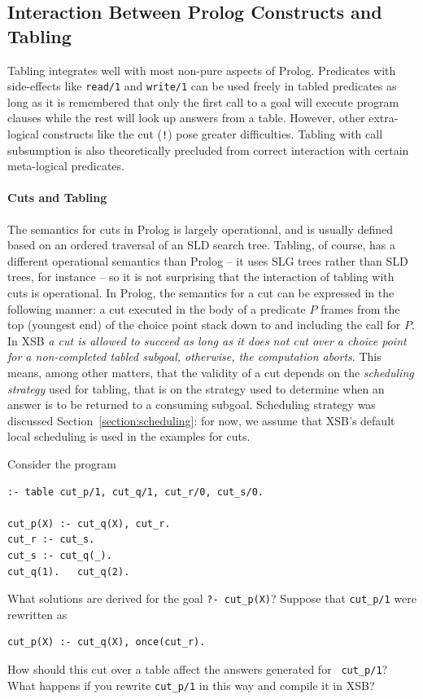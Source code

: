 
\subsection{Interaction Between Prolog Constructs and Tabling}

Tabling integrates well with most non-pure aspects of Prolog.
Predicates with side-effects like {\tt read/1} and {\tt write/1} can
be used freely in tabled predicates as long as it is remembered that
only the first call to a goal will execute program clauses while the
rest will look up answers from a table.  However, other extra-logical
constructs like the cut (\texttt{!}) pose greater difficulties.
Tabling with call subsumption is also theoretically precluded from
correct interaction with certain meta-logical predicates.

\paragraph{Cuts and Tabling} \label{sec:cuts}

The semantics for cuts in Prolog is largely operational, and is
usually defined based on an ordered traversal of an SLD search tree.
Tabling, of course, has a different operational semantics than Prolog
-- it uses SLG trees rather than SLD trees, for instance -- so it is
not surprising that the interaction of tabling with cuts is
operational.  In Prolog, the semantics for a cut can be expressed in
the following manner: a cut executed in the body of a predicate $P$
frames from the top (youngest end) of the choice point stack down to
and including the call for $P$.  In XSB {\em a cut is allowed to
  succeed as long as it does not cut over a choice point for a
  non-completed tabled subgoal, otherwise, the computation aborts}.
This means, among other matters, that the validity of a cut depends on
the {\em scheduling strategy} used for tabling, that is on the
strategy used to determine when an answer is to be returned to a
consuming subgoal.  Scheduling strategy was discussed
Section~\ref{section:scheduling}: for now, we assume that XSB's
default local scheduling is used in the examples for cuts.

\begin{exercise} \label{ex:nocut}
Consider the program
\begin{verbatim}
:- table cut_p/1, cut_q/1, cut_r/0, cut_s/0.

cut_p(X) :- cut_q(X), cut_r.
cut_r :- cut_s.
cut_s :- cut_q(_).
cut_q(1).   cut_q(2).
\end{verbatim}
What solutions are derived for the goal {\tt ?- cut\_p(X)}\@?  Suppose
that {\tt cut\_p/1} were rewritten as
\begin{verbatim}
cut_p(X) :- cut_q(X), once(cut_r).
\end{verbatim}
How should this cut over a table affect the answers generated for {\tt
cut\_p/1}?  What happens if you rewrite {\tt cut\_p/1} in this way and
compile it in XSB?\fillBox
\end{exercise}

